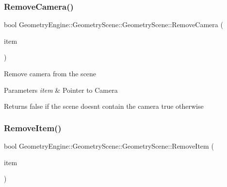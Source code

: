 \subsubsection{\texorpdfstring{RemoveCamera()}{RemoveCamera()}}
{\footnotesize\ttfamily bool Geometry\+Engine\+::\+Geometry\+Scene\+::\+Geometry\+Scene\+::\+Remove\+Camera (\begin{DoxyParamCaption}\item[{\mbox{\hyperlink{class_geometry_engine_1_1_geometry_world_item_1_1_geometry_camera_1_1_camera}{Geometry\+World\+Item\+::\+Geometry\+Camera\+::\+Camera}} $\ast$}]{item }\end{DoxyParamCaption})\hspace{0.3cm}{\ttfamily [virtual]}}

Remove camera from the scene 
\begin{DoxyParams}{Parameters}
{\em item} & Pointer to Camera \\
\hline
\end{DoxyParams}
\begin{DoxyReturn}{Returns}
false if the scene doesn\textquotesingle{}t contain the camera true otherwise 
\end{DoxyReturn}
\mbox{\label{class_geometry_engine_1_1_geometry_scene_1_1_geometry_scene_afc7294415ed5013f22c4c8e587437019}} 
\subsubsection{\texorpdfstring{RemoveItem()}{RemoveItem()}}
{\footnotesize\ttfamily bool Geometry\+Engine\+::\+Geometry\+Scene\+::\+Geometry\+Scene\+::\+Remove\+Item (\begin{DoxyParamCaption}\item[{\mbox{\hyperlink{class_geometry_engine_1_1_geometry_world_item_1_1_geometry_item_1_1_geometry_item}{Geometry\+World\+Item\+::\+Geometry\+Item\+::\+Geometry\+Item}} $\ast$}]{item }\end{DoxyParamCaption})\hspace{0.3cm}{\ttfamily [virtual]}}

